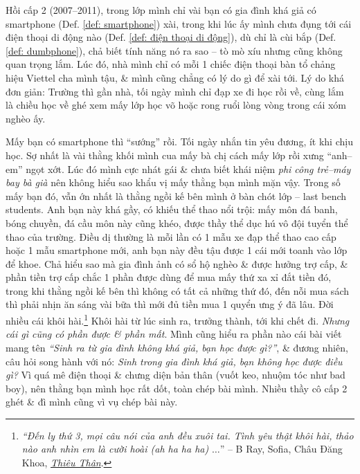 \documentclass[12pt,twoside]{book}
\begin{document}
Hồi cấp 2 (2007--2011), trong lớp mình chỉ vài bạn có gia đình khá giả có smartphone (Def. \ref{def: smartphone}) xài, trong khi lúc ấy mình chưa đụng tới cái điện thoại di động nào (Def. \ref{def: điện thoại di động}), dù  chỉ là cùi bắp (Def. \ref{def: dumbphone}), chả biết tính năng nó ra sao -- tò mò xíu nhưng cũng không quan trọng lắm. Lúc đó, nhà mình chỉ có mỗi 1 chiếc điện thoại bàn tổ chảng hiệu Viettel cha mình tậu, \& mình cũng chẳng có lý do gì để xài tới. Lý do khá đơn giản: Trường thì gần nhà, tối ngày mình chỉ đạp xe đi học rồi về, cùng lắm là chiều học về ghé xem mấy lớp học võ hoặc rong ruổi lòng vòng trong cái xóm nghèo ấy.

Mấy bạn có smartphone thì ``sướng'' rồi. Tối ngày nhắn tin yêu đương, ít khi chịu học. Sợ nhất là vài thằng khối mình cua mấy bà chị cách mấy lớp rồi xưng ``anh--em'' ngọt xớt. Lúc đó mình cực nhát gái \& chưa biết khái niệm {\it phi công trẻ--máy bay bà già} nên không hiểu sao khẩu vị mấy thằng bạn mình mặn vậy. Trong số mấy bạn đó, vẫn ớn nhất là thằng ngồi kế bên mình ở bàn chót lớp -- last bench students. Anh bạn này khá gầy, có khiếu thể thao nổi trội: mấy môn đá banh, bóng chuyền, đá cầu môn này cũng khéo, được thầy thể dục hú vô đội tuyển thể thao của trường. Điều dị thường là mỗi lần có 1 mẫu xe đạp thể thao cao cấp hoặc 1 mẫu smartphone mới, anh bạn này đều tậu được 1 cái mới toanh vào lớp để khoe. Chả hiểu sao mà gia đình ảnh có sổ hộ nghèo \& được hưởng trợ cấp, \& phần tiền trợ cấp chắc 1 phần được dùng để mua mấy thứ xa xỉ đắt tiền đó, trong khi thằng ngồi kế bên thì không có tất cả những thứ đó, đến nỗi mua sách thì phải nhịn ăn sáng vài bữa thì mới đủ tiền mua 1 quyển ưng ý đã lâu. Đời nhiều cái khôi hài.\footnote{{\it``Đến ly thứ 3, mọi câu nói của anh đều xuôi tai. Tình yêu thật khôi hài, thảo nào anh nhìn em là cười hoài (ah ha ha ha)} $\ldots$'' -- B Ray, Sofia, Châu Đăng Khoa, \href{https://www.youtube.com/watch?v=cfbNtHNCMBo}{{\it Thiêu Thân}}.} Khôi hài từ lúc sinh ra, trưởng thành, tới khi chết đi. {\it Nhưng cái gì cũng có phần được \& phần mất}. Mình cũng hiểu ra phần nào cái bài viết mang tên {\it``Sinh ra từ gia đình không khá giả, bạn học được gì?''}, \& đương nhiên, câu hỏi song hành với nó: {\it Sinh trong gia đình khá giả, bạn không học được điều gì?} Vì quá mê điện thoại \& chưng diện bản thân (vuốt keo, nhuộm tóc như bad boy), nên thằng bạn mình học rất dốt, toàn chép bài mình. Nhiều thầy cô cấp 2 ghét \& đì mình cũng vì vụ chép bài này.
\end{document}
